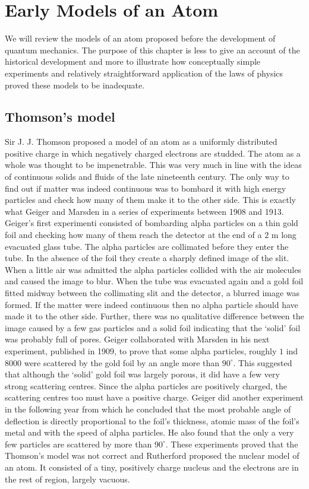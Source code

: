 \chapter{Early Models of an Atom}\label{c3}
We will review the models of an atom proposed before the development of quantum
mechanics. The purpose of this chapter is less to give an account of the 
historical development and more to illustrate how conceptually simple 
experiments and relatively straightforward application of the laws of physics 
proved these models to be inadequate.

\section{Thomson's model}\label{c3s1}
Sir J. J. Thomson proposed a model of an atom as a uniformly distributed 
positive charge in which negatively charged electrons are studded. The atom as
a whole was thought to be impenetrable. This was very much in line with the 
ideas of continuous solids and fluids of the late nineteenth century. The only
way to find out if matter was indeed continuous was to bombard it with high
energy particles and check how many of them make it to the other side. This
is exactly what Geiger and Marsden in a series of experiments between 1908 and
1913. Geiger's first experimenti \cite{geiger1908scattering} consisted of 
bombarding alpha particles on a thin gold foil and checking how many of them 
reach the detector at the end of a $2$ m long evacuated glass tube. The alpha 
particles are collimated before they enter the tube. In the absence of the foil 
they create a sharply defined image of the slit. When a little air was admitted 
the alpha particles collided with the air molecules and caused the image to 
blur. When the tube was evacuated again and a gold foil fitted midway between 
the collimating slit and the detector, a blurred image was formed. If the matter
were indeed continuous then no alpha particle should have made it to the other
side. Further, there was no qualitative difference between the image caused by a
few gas particles and a solid foil indicating that the `solid' foil was 
probably full of pores. Geiger collaborated with Marsden in his next experiment,
published \cite{gegier1909diffuse} in 1909, to prove that some alpha particles,
roughly $1$ ind $8000$ were scattered by the gold foil by an angle more than
$90^\circ$. This suggested that although the `solid' gold foil was largely 
porous, it did have a few very strong scattering centres. Since the alpha
particles are positively charged, the scattering centres too must have a 
positive charge. Geiger did another experiment \cite{geiger1910scattering} in 
the following year from which he concluded that the most probable angle of
deflection is directly proportional to the foil's thickness, atomic mass of
the foil's metal and with the speed of alpha particles. He also found that the
only a very few particles are scattered by more than $90^\circ$. These 
experiments proved that the Thomson's model was not correct and Rutherford 
proposed \cite{rutherform1911scattering} the nuclear model of an atom. It 
consisted of a tiny, positively charge nucleus and the electrons are in the 
rest of region, largely vacuous.

